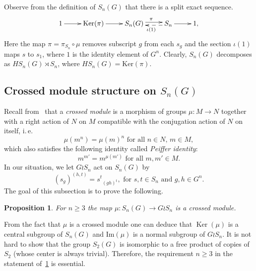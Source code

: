 \documentclass[oneside, 10pt]{amsart}
\theoremstyle{plain}
\numberwithin{equation}{section}
\numberwithin{lemma}{section}
\newtheorem{prop}[lemma]{Proposition}
\theoremstyle{remark}
\theoremstyle{definition}
\DeclareMathOperator{\Ker}{Ker}
\begin{document}
Observe from the definition of $S_n(G)$ that there is a split exact sequence.
\begin{equation} \label{eq:ex-seq} \xymatrix{1 \ar[r] & \mathrm{Ker}(\pi) \ar[r] &  S_n(G) \ar@<0.5ex>[r]^{\pi} & S_n \ar[r] \ar@{-->}@<0.5ex>[l]^{\iota(1)} & 1,} \end{equation}
Here the map $\pi = \pi_{S_n} \circ \mu$ removes subscript $g$ from each $s_g$ and the section $\iota(1)$ maps $s$ to $s_1$, where $1$ is the identity element of $G^n$.
Clearly, $S_n(G)$ decomposes as $HS_n(G) \rtimes S_n$, where $HS_n(G) = \mathrm{Ker}(\pi)$.

\subsection{Crossed module structure on $S_n(G)$}
Recall from~\cite[\S~2.2]{BHS11} that a {\it crossed module} is a morphism of groups $\mu\colon M\to N$ together with a right action of $N$ on $M$ 
compatible with the conjugation action of $N$ on itself, i.\,e.
\begin{equation} \label{eq:precrossed} \tag{CM1} \mu(m^n) = \mu(m)^n \text{ for all $n \in N$, $m \in M$}, \end{equation}
which also satisfies the following identity called {\it Peiffer identity}:
\begin{equation} \label{eq:Peiffer} \tag{CM2} m^{m'} = m^{\mu(m')} \text{ for all $m, m' \in M$}.\end{equation}
In our situation, we let $G \wr S_n$ act on $S_n(G)$ by 
\begin{equation} \label{eq:action} (s_g)^{(h, t)} = {s^t}_{(gh)^t}, \text{ for $s, t \in S_n$ and $g, h \in G^n$.} \end{equation}
The goal of this subsection is to prove the following.
\begin{prop} \label{thm:cms} For $n \geq 3$ the map $\mu \colon S_n(G) \to G \wr S_n $ is a crossed module. \end{prop}
From the fact that $\mu$ is a crossed module one can deduce that $\Ker(\mu)$ is a central subgroup of $S_n(G)$ and $\mathrm{Im}(\mu)$ is a normal subgroup of $G \wr S_n$.
It is not hard to show that the group $S_2(G)$ is isomorphic to a free product of copies of $S_2$ (whose center is always trivial).
Therefore, the requirement $n\geq 3$ in the statement of~\cref{thm:cms} is essential.
\end{document}
